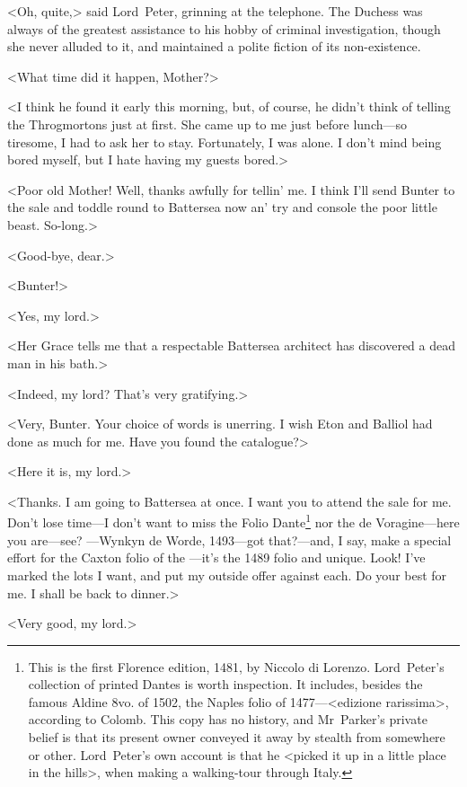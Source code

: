 <Oh, quite,> said Lord~Peter, grinning at the telephone. The Duchess was always of the greatest assistance to his hobby of criminal investigation, though she never alluded to it, and maintained a polite fiction of its non-existence.

<What time did it happen, Mother?>

<I think he found it early this morning, but, of course, he didn't think of telling the Throgmortons just at first. She came up to me just before lunch—so tiresome, I had to ask her to stay. Fortunately, I was alone. I don't mind being bored myself, but I hate having my guests bored.>

<Poor old Mother! Well, thanks awfully for tellin' me. I think I'll send Bunter to the sale and toddle round to Battersea now an' try and console the poor little beast. So-long.>

<Good-bye, dear.>

<Bunter!>

<Yes, my lord.>

<Her Grace tells me that a respectable Battersea architect has discovered a dead man in his bath.>

<Indeed, my lord? That's very gratifying.>

<Very, Bunter. Your choice of words is unerring. I wish Eton and Balliol had done as much for me. Have you found the catalogue?>

<Here it is, my lord.>

<Thanks. I am going to Battersea at once. I want you to attend the sale for me. Don't lose time—I don't want to miss the Folio Dante\footnote{This is the first Florence edition, 1481, by Niccolo di Lorenzo. Lord~Peter's collection of printed Dantes is worth inspection. It includes, besides the famous Aldine 8vo. of 1502, the Naples folio of 1477—<edizione rarissima>, according to Colomb. This copy has no history, and Mr~Parker's private belief is that its present owner conveyed it away by stealth from somewhere or other. Lord~Peter's own account is that he <picked it up in a little place in the hills>, when making a walking-tour through Italy.} nor the de Voragine—here you are—see? —Wynkyn de Worde, 1493—got that?—and, I say, make a special effort for the Caxton folio of the —it's the 1489 folio and unique. Look! I've marked the lots I want, and put my outside offer against each. Do your best for me. I shall be back to dinner.>

<Very good, my lord.>

